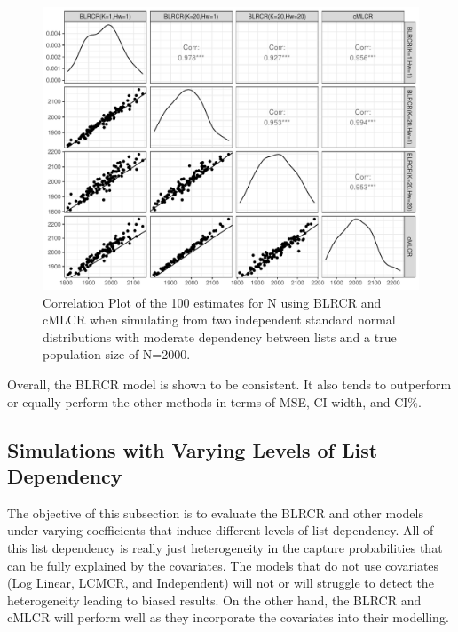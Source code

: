 \documentclass[
  12pt,
]{article}
\begin{document}
\begin{figure}[H]

{\centering \includegraphics{dissertationmain_files/figure-latex/plotNvalues-1} 

}

\caption{\label{fig:normalx} Correlation Plot of the 100 estimates for N using BLRCR and cMLCR when simulating from two independent standard normal distributions with moderate dependency between lists and a true population size of N=2000.}\label{fig:plotNvalues}
\end{figure}

Overall, the BLRCR model is shown to be consistent. It also tends to
outperform or equally perform the other methods in terms of MSE, CI
width, and CI\(\%\).

\subsection{Simulations with Varying Levels of List Dependency }
\label{Sec:simslistdepend}

The objective of this subsection is to evaluate the BLRCR and other
models under varying coefficients that induce different levels of list
dependency. All of this list dependency is really just heterogeneity in
the capture probabilities that can be fully explained by the covariates.
The models that do not use covariates (Log Linear, LCMCR, and
Independent) will not or will struggle to detect the heterogeneity
leading to biased results. On the other hand, the BLRCR and cMLCR will
perform well as they incorporate the covariates into their modelling.
\end{document}
